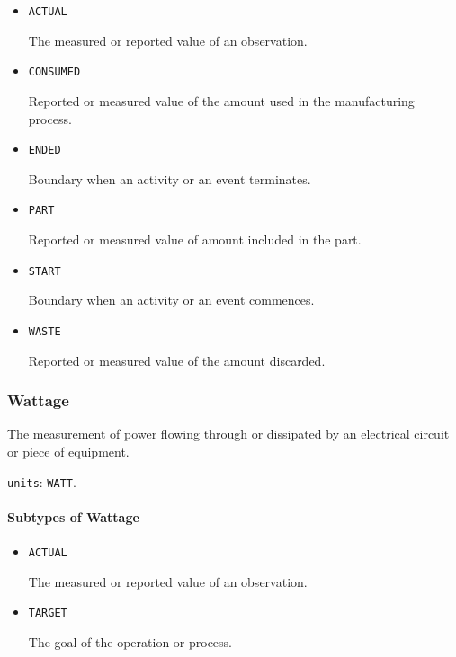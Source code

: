 \begin{itemize}

\item \texttt{ACTUAL}


The measured or reported value of an \gls{observation}.

\item \texttt{CONSUMED}


Reported or measured value of the amount used in the manufacturing process.

\item \texttt{ENDED}


Boundary when an activity or an event terminates.

\item \texttt{PART}


Reported or measured value of amount included in the \gls{part}.

\item \texttt{START}


Boundary when an activity or an event commences.

\item \texttt{WASTE}


Reported or measured value of the amount discarded.


\end{itemize}









\subsubsection{Wattage}
\label{sec:Wattage}



The measurement of power flowing through or dissipated by an electrical circuit or piece of equipment.


\texttt{units}: \texttt{WATT}.

\paragraph{Subtypes of Wattage}\mbox{}
\label{sec:Subtypes of Wattage}

\begin{itemize}

\item \texttt{ACTUAL}


The measured or reported value of an \gls{observation}.

\item \texttt{TARGET}


The goal of the operation or process.


\end{itemize}





